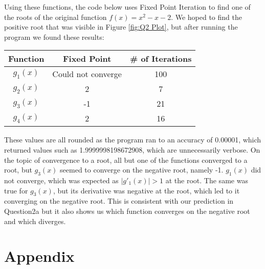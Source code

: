 \documentclass[12pt]{article}
\begin{document}
\begin{enumerate}
        Using these functions, the code below uses Fixed Point Iteration to find one of the roots of the 
        original function $f(x) = x^2 - x - 2$. We hoped to find the positive root that was visible 
        in Figure \ref{fig:Q2 Plot}, but after running the program we found these results:

        \begin{table}[H]
            \centering
            \begin{tabular}{ccc}
                \hline
                Function & Fixed Point & \# of Iterations \\
                \hline
                $g_1(x)$ & Could not converge & 100 \\
                $g_2(x)$ & 2 & 7 \\
                $g_3(x)$ & -1 & 21 \\
                $g_4(x)$ & 2 & 16 \\
                \hline
            \end{tabular}
        \end{table}

        These values are all rounded as the program ran to an accuracy of 0.00001, which returned values 
        such as 1.9999998198672908, which are unnecessarily verbose. 
        \newline
        On the topic of convergence to a root, all but one of the functions converged to a root, but 
        $g_3(x)$ seemed to converge on the negative root, namely -1. $g_1(x)$ did not converge, which was 
        expected as $|g'_1(x)| > 1$ at the root. The same was true for $g_3(x)$, but its derivative was 
        negative at the root, which led to it converging on the negative root. This is consistent with our 
        prediction in Question2a but it also shows us which function converges on the negative root and 
        which diverges. 
        \newline
        
        
        \newpage
        \section*{Appendix}
        
        
        
    \end{enumerate}
\end{document}
